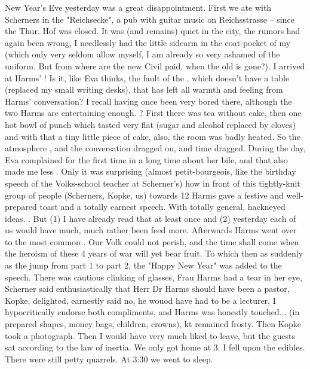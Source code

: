 
New Year's Eve yesterday was a great disappointment. First we ate with Scherners in the "Reichsecke", a pub with guitar music on Reichsstrasse -- since the Thur. Hof was closed. It was (and remains) quiet in the city, the rumors had again been wrong, I needlessly had the little sidearm in the coat-pocket of my  (which only very seldom allow myself, I am already so very ashamed of the uniform. But from where are the new Civil paid, when the old is gone?). I arrived at Harms' ! Is it, like Eva thinks, the fault of the , which doesn't have a table (replaced my small writing desks), that has left all warmth and feeling from Harms' conversation? I recall having once been very bored there, although the two Harms  are entertaining enough. ? First there was tea without cake, then one hot bowl of punch which tasted very flat (sugar and alcohol replaced by cloves) and with that a tiny little piece of cake, also, the room was badly heated. So the atmosphere , and the conversation dragged on, and time dragged. During the day, Eva complained for the first time in a long time about her bile, and that also made me less . Only it was surprising (almost petit-bourgeois, like the birthday speech of the Volks-school teacher at Scherner's) how in front of this tightly-knit group of people (Scherners, Kopke, us) towards 12 Harms gave a festive and well-prepared toast and  a totally earnest speech. With totally general, hackneyed ideas. . But (1) I have already read that at least once and (2) yesterday each of us would have much, much rather been feed more. Afterwards Harms went over to the most common . Our Volk could not perish, and the time shall come when the heroism of these 4 years of war will yet bear fruit. To which then as suddenly as the jump from part 1 to part 2, the "Happy New Year" was added to the speech. There was cautious clinking of glasses, Frau Harms had a tear in her eye, Scherner said enthusiastically that Herr Dr Harms should have been a pastor, Kopke, delighted, earnestly said no, he wouod have had to be a lecturer, I hypocritically endorse both compliments, and Harms was honestly touched... (in prepared shapes, money bags, children, crowns), kt remained frosty. Then Kopke took a photograph. Then I would have very much liked to leave, but the guests sat according to the law of inertia. We only got home at 3. I fell upon the edibles. There were still petty quarrels. At 3:30 we went to sleep. 